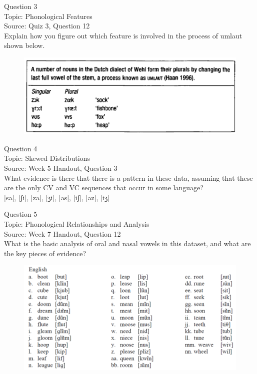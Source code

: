 \documentclass[12pt]{article}
\begin{document}
\newpage

{\large Question 3}\\

Topic: Phonological Features\\
Source: Quiz 3, Question 12\\

Explain how you figure out which feature is involved in the process of umlaut shown below.\\

\begin{figure}[H]
\includegraphics{../images/dutch.png}
\end{figure}

\newpage

{\large Question 4}\\

Topic: Skewed Distributions\\
Source: Week 5 Handout, Question 3\\

What evidence is there that there is a pattern in these data, assuming that these are the only CV and VC sequences that occur in some language?\\

{[sa]}, {[ʃi]}, {[za]}, {[ʒi]}, {[as]}, {[iʃ]}, {[az]}, {[iʒ]}


\newpage

{\large Question 5}\\

Topic: Phonological Relationships and Analysis\\
Source: Week 7 Handout, Question 12\\

What is the basic analysis of oral and nasal vowels in this dataset, and what are the key pieces of evidence?\\

\begin{figure}[H]
\includegraphics{../images/english12.png}
\end{figure}
\end{document}
